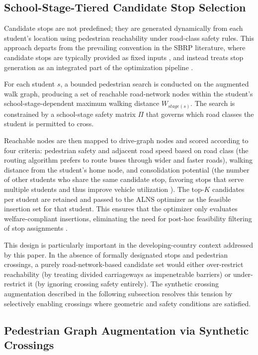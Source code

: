\documentclass[journal]{IEEEtran}
\begin{document}
\subsection{School-Stage-Tiered Candidate Stop Selection}

Candidate stops are not predefined; they are generated dynamically 
from each student's location using pedestrian reachability under 
road-class safety rules. This approach departs from the prevailing 
convention in the SBRP literature, where candidate stops are 
typically provided as fixed inputs \cite{c4}, and instead treats 
stop generation as an integrated part of the optimization 
pipeline \cite{c6}.

For each student $s$, a bounded pedestrian search is conducted on 
the augmented walk graph, producing a set of reachable road-network 
nodes within the student's school-stage-dependent maximum walking 
distance $W_{stage(s)}$. The search is constrained by a 
school-stage safety matrix $\Pi$ that governs which road classes 
the student is permitted to cross.

Reachable nodes are then mapped to drive-graph nodes and scored 
according to four criteria: pedestrian safety and adjacent road 
speed based on road class (the routing algorithm prefers to route 
buses through wider and faster roads), walking distance from the 
student's home node, and consolidation potential (the number of 
other students who share the same candidate stop, favoring stops 
that serve multiple students and thus improve vehicle 
utilization \cite{c15}). The top-$K$ candidates per student are 
retained and passed to the ALNS optimizer as the feasible insertion 
set for that student. This ensures that the optimizer only 
evaluates welfare-compliant insertions, eliminating the need for 
post-hoc feasibility filtering of stop assignments \cite{c12}.

This design is particularly important in the developing-country
context addressed by this paper. In the absence of formally
designated stops and pedestrian crossings, a purely
road-network-based candidate set would either over-restrict
reachability (by treating divided carriageways as impenetrable
barriers) or under-restrict it (by ignoring crossing safety
entirely). The synthetic crossing augmentation described in the
following subsection resolves this tension by selectively enabling
crossings where geometric and safety conditions are satisfied.

\subsection{Pedestrian Graph Augmentation via Synthetic Crossings}
\end{document}
